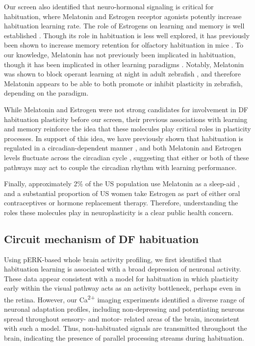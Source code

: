 \documentclass[9pt,lineno]{RandlettLab_elife}
\begin{document}
Our screen also identified that neuro-hormonal signaling is critical for habituation, where Melatonin and Estrogen receptor agonists potently increase habituation learning rate. The role of Estrogens on learning and memory is well established \cite{Luine1998-iz,Nilsson2002-fi}. Though its role in habituation is less well explored, it has previously been shown to increase memory retention for olfactory habituation in mice \cite{Dillon2013-ez}. To our knowledge, Melatonin has not previously been implicated in habituation, though it has been implicated in other learning paradigms \cite{El-Sherif2003-tv, Jilg2019-lq}. Notably, Melatonin was shown to block operant learning at night in adult zebrafish \cite{Rawashdeh2007-ts}, and therefore Melatonin appears to be able to both promote or inhibit plasticity in zebrafish, depending on the paradigm. 

While Melatonin and Estrogen were not strong candidates for involvement in DF habituation plasticity before our screen, their previous associations with learning and memory reinforce the idea that these molecules play critical roles in plasticity processes. In support of this idea, we have previously shown that habituation is regulated in a circadian-dependent manner \cite{Randlett2019-fi}, and both Melatonin and Estrogen levels fluctuate across the circadian cycle \cite{Alvord2022-ii, Gandhi2015-vw, Zhdanova2001-dq}, suggesting that either or both of these pathways may act to couple the circadian rhythm with learning performance. 

Finally, approximately 2\% of the US population use Melatonin as a sleep-aid \cite{Li2022-lu}, and a substantial proportion of US women take Estrogen as part of either oral contraceptives or hormone replacement therapy. Therefore, understanding the roles these molecules play in neuroplasticity is a clear public health concern. 

\subsection{Circuit mechanism of DF habituation}

Using pERK-based whole brain activity profiling, we first identified that habituation learning is associated with a broad depression of neuronal activity. These data appear consistent with a model for habituation in which plasticity early within the visual pathway acts as an activity bottleneck, perhaps even in the retina. However, our Ca\textsuperscript{2+} imaging experiments identified a diverse range of neuronal adaptation profiles, including non-depressing and potentiating neurons spread throughout sensory- and motor- related areas of the brain, inconsistent with such a model. Thus, non-habituated signals are transmitted throughout the brain, indicating the presence of parallel processing streams during habituation. 
\end{document}
